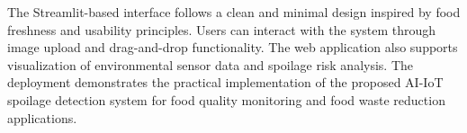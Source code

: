 The Streamlit-based interface follows a clean and minimal design inspired by food freshness and usability principles. Users can interact with the system through image upload and drag-and-drop functionality. The web application also supports visualization of environmental sensor data and spoilage risk analysis. The deployment demonstrates the practical implementation of the proposed AI-IoT spoilage detection system for food quality monitoring and food waste reduction applications.
